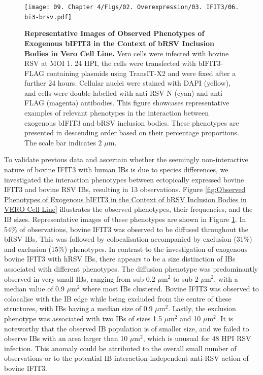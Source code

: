 \begin{figure}
    \centering
    \texttt{[image: 09. Chapter 4/Figs/02. Overexpression/03. IFIT3/06. bi3-brsv.pdf]}
    \caption[Representative Images of Observed Phenotypes of Exogenous bIFIT3 in the Context of bRSV Inclusion Bodies in Vero Cell Line.]{\textbf{Representative Images of Observed Phenotypes of Exogenous bIFIT3 in the Context of bRSV Inclusion Bodies in Vero Cell Line.} Vero cells were infected with bovine RSV at MOI 1. 24 HPI, the cells were transfected with bIFIT3-FLAG containing plasmids using TransIT-X2 and were fixed after a further 24 hours. Cellular nuclei were stained with DAPI (yellow), and cells were double-labelled with anti-RSV N (cyan) and anti-FLAG (magenta) antibodies. This figure showcases representative examples of relevant phenotypes in the interaction between exogenous bIFIT3 and bRSV inclusion bodies. These phenotypes are presented in descending order based on their percentage proportions. The scale bar indicates 2 \(\mu \mbox{m}\).}
    \label{fig:Representative Images of Observed Phenotypes of Exogenous bIFIT3 in the Context of bRSV Inclusion Bodies in VERO Cell Line}
\end{figure}

To validate previous data and ascertain whether the seemingly non-interactive nature of bovine IFIT3 with human IBs is due to species differences, we investigated the interaction phenotypes between ectopically expressed bovine IFIT3 and bovine RSV IBs, resulting in 13 observations. Figure \ref{fig:Observed Phenotypes of Exogenous bIFIT3 in the Context of bRSV Inclusion Bodies in VERO Cell Line} illustrates the observed phenotypes, their frequencies, and the IB sizes. Representative images of these phenotypes are shown in Figure \ref{fig:Representative Images of Observed Phenotypes of Exogenous bIFIT3 in the Context of bRSV Inclusion Bodies in VERO Cell Line}. In 54\% of observations, bovine IFIT3 was observed to be diffused throughout the bRSV IBs. This was followed by colocalisation accompanied by exclusion (31\%) and exclusion (15\%) phenotypes. In contrast to the investigation of exogenous bovine IFIT3 with hRSV IBs, there appears to be a size distinction of IBs associated with different phenotypes. The diffusion phenotype was predominantly observed in very small IBs, ranging from sub-0.2 \(\mu \mbox{m}^2\) to sub-2 \(\mu \mbox{m}^2\), with a median value of 0.9 \(\mu \mbox{m}^2\) where most IBs clustered. Bovine IFIT3 was observed to colocalise with the IB edge while being excluded from the centre of these structures, with IBs having a median size of 0.9 \(\mu \mbox{m}^2\). Lastly, the exclusion phenotype was associated with two IBs of sizes 1.5 \(\mu \mbox{m}^2\) and 10 \(\mu \mbox{m}^2\). It is noteworthy that the observed IB population is of smaller size, and we failed to observe IBs with an area larger than 10 \(\mu \mbox{m}^2\), which is unusual for 48 HPI RSV infection. This anomaly could be attributed to the overall small number of observations or to the potential IB interaction-independent anti-RSV action of bovine IFIT3.

